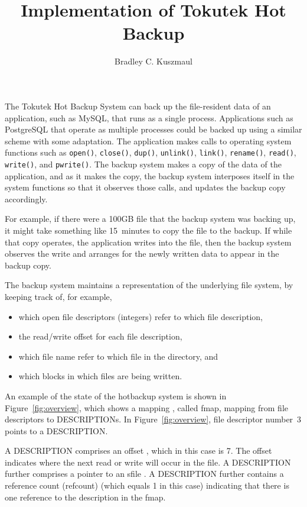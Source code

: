 \documentclass[10pt]{article}
\title{Implementation of Tokutek Hot Backup}
\author{Bradley C. Kuszmaul}
\newcommand{\figref}[1]{Figure~\ref{fig:#1}}
\begin{document}
\maketitle

The Tokutek Hot Backup System can back up the file-resident data of an
application, such as MySQL, that runs as a single process.
Applications such as PostgreSQL that operate as multiple processes
could be backed up using a similar scheme with some adaptation.  The
application makes calls to operating system functions such as
\texttt{open()}, \texttt{close()}, \texttt{dup()}, \texttt{unlink()},
\texttt{link()}, \texttt{rename()}, \texttt{read()}, \texttt{write()},
and \texttt{pwrite()}.  The backup system makes a copy of the data of
the application, and as it makes the copy, the backup system
interposes itself in the system functions so that it observes those
calls, and updates the backup copy accordingly.

For example, if there were a 100GB file that the backup system was
backing up, it might take something like 15~minutes to copy the file
to the backup.  If while that copy operates, the application writes
into the file, then the backup system observes the write and arranges
for the newly written data to appear in the backup copy.

The backup system maintains a representation of the underlying file
system, by keeping track of, for example,
\begin{itemize}
\item which open file descriptors (integers) refer to which file description,
\item the read/write offset for each file description,
\item which file name refer to which file in the directory, and
\item which blocks in which files are being written.
\end{itemize}

An example of the state of the hotbackup system is shown in
\figref{overview}, which shows a mapping \citefmap, called fmap,
mapping from file descriptors to DESCRIPTIONs.  In \figref{overview},
file descriptor number~3 points to a DESCRIPTION.

A DESCRIPTION \citedescr comprises an offset \citeoffset, which in
this case is 7. The offset indicates where the next read or write will
occur in the file.  A DESCRIPTION further comprises a pointer
\citesfileptr to an sfile \citesfile.  A DESCRIPTION further contains
a reference count (refcount) \citedrefcount (which equals 1 in this case)
indicating that there is one reference to the description in the fmap.
\end{document}
